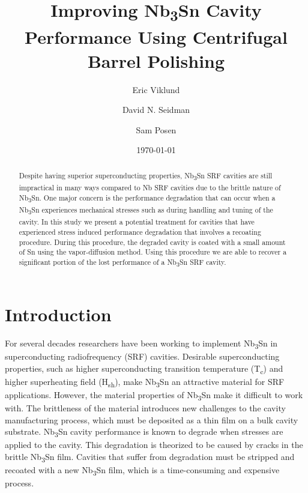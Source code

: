 \documentclass{revtex4-2}
\begin{document}
\title{Improving Nb\textsubscript{3}Sn Cavity Performance Using Centrifugal Barrel Polishing}
\author{Eric Viklund}
\author{David N. Seidman}
\author{Sam Posen}


\date{\today}

\begin{abstract}

    Despite having superior superconducting properties, Nb\textsubscript{3}Sn SRF cavities are still impractical in many ways compared to Nb SRF cavities due to the brittle nature of Nb\textsubscript{3}Sn. One major concern is the performance degradation that can occur when a Nb\textsubscript{3}Sn experiences mechanical stresses such as during handling and tuning of the cavity. In this study we present a potential treatment for cavities that have experienced stress induced performance degradation that involves a recoating procedure. During this procedure, the degraded cavity is coated with a small amount of Sn using the vapor-diffusion method. Using this procedure we are able to recover a significant portion of the lost performance of a Nb\textsubscript{3}Sn SRF cavity.

\end{abstract}

\maketitle

\section{Introduction}
\label{sec:Introduction}

For several decades researchers have been working to implement Nb\textsubscript{3}Sn in superconducting radiofrequency (SRF) cavities. Desirable superconducting properties, such as higher superconducting transition temperature (T\textsubscript{c}) and higher superheating field (H\textsubscript{sh})\cite{liarte2017theoretical, catelani2008temperature, lin2012effect, kubo2020superfluid}, make Nb\textsubscript{3}Sn an attractive material for SRF applications. However, the material properties of Nb\textsubscript{3}Sn make it difficult to work with. The brittleness of the material introduces new challenges to the cavity manufacturing process, which must be deposited as a thin film on a bulk cavity substrate.\cite{posen2017nb3sn, pudasaini2019growth, porter2018update} Nb\textsubscript{3}Sn cavity performance is known to degrade when stresses are applied to the cavity. This degradation is theorized to be caused by cracks in the brittle Nb\textsubscript{3}Sn film. Cavities that suffer from degradation must be stripped and recoated with a new Nb\textsubscript{3}Sn film, which is a time-consuming and expensive process.
\end{document}
